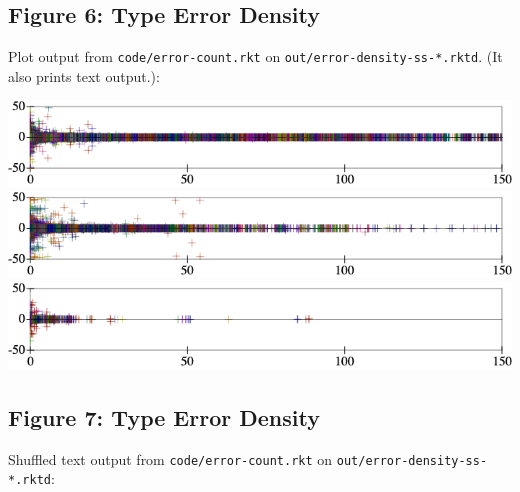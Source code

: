 \documentclass{article}
\begin{document}
\subsection*{Figure 6: Type Error Density}

Plot output from \texttt{code/error-count.rkt}
on \texttt{out/error-density-ss-*.rktd}.
(It also prints text output.):

\includegraphics[width=0.8\columnwidth]{out/error-count-nocheck-row--te-density-diff.pdf}
\includegraphics[width=0.8\columnwidth]{out/error-count-nonstrict-row--te-density-diff.pdf}
\includegraphics[width=0.8\columnwidth]{out/error-count-strict-row--te-density-diff.pdf}


\subsection*{Figure 7: Type Error Density}

Shuffled text output from \texttt{code/error-count.rkt}
on \texttt{out/error-density-ss-*.rktd}:
\end{document}
